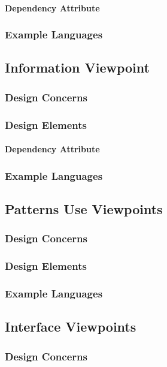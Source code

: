 \documentclass[letterpaper,10pt,titlepage,draftclsnofoot,onecolumn,onesided] {IEEEtran}
\begin{document}
\paragraph{Dependency Attribute}
\subsubsection{Example Languages}

\subsection{Information Viewpoint}
\subsubsection{Design Concerns}
\subsubsection{Design Elements}
\paragraph{Dependency Attribute}
\subsubsection{Example Languages}

\subsection{Patterns Use Viewpoints}
\subsubsection{Design Concerns}
\subsubsection{Design Elements}
\subsubsection{Example Languages}

\subsection{Interface Viewpoints}
\subsubsection{Design Concerns}
\end{document}
